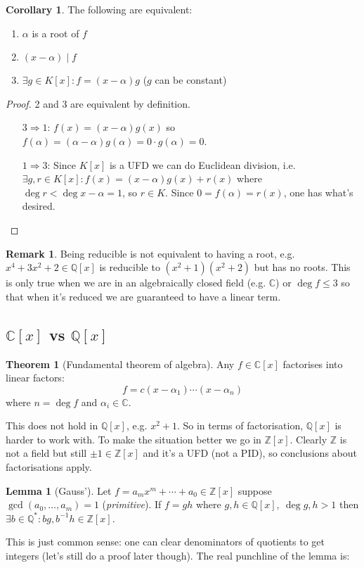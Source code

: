 \documentclass[a4paper]{article}
\newcommand{\Z}{\mathbb Z}
\newcommand{\Q}{\mathbb Q}
\newcommand{\C}{\mathbb C}
\theoremstyle{definition}
\newtheorem{thm}[defn]{Theorem}
\newtheorem{lemma}[defn]{Lemma}
\newtheorem{coro}[defn]{Corollary}
\newtheorem*{remark}{Remark}
\begin{document}
\begin{coro}
The following are equivalent:
\begin{enumerate}
\item $\alpha$ is a root of $f$
\item $(x-\alpha) \mid f$
\item $\exists g\in K[x]:f=(x-\alpha)g$ ($g$ can be constant)
\end{enumerate}
\end{coro}

\begin{proof}
2 and 3 are equivalent by definition.
\begin{itemize}
\item[$3\Rightarrow 1$:] $f(x)=(x-\alpha)g(x)$ so $f(\alpha)=(\alpha-\alpha)g(\alpha)=0\cdot g(\alpha)=0$.
\item[$1\Rightarrow 3$:] Since $K[x]$ is a UFD we can do Euclidean division, i.e. $\exists g,r\in K[x]:f(x)=(x-\alpha)g(x)+r(x)$ where $\deg r<\deg x-\alpha=1$, so $r\in K$. Since $0=f(\alpha)=r(x)$, one has what's desired.
\end{itemize}
\end{proof}

\begin{remark}
Being reducible is not equivalent to having a root, e.g. $x^4+3x^2+2\in\Q[x]$ is reducible to $(x^2+1)(x^2+2)$ but has no roots. This is only true when we are in an algebraically closed field (e.g. $\C$) or $\deg f\leq 3$ so that when it's reduced we are guaranteed to have a linear term.
\end{remark}
\subsection{$\C[x]$ vs $\Q[x]$}
\begin{thm}[Fundamental theorem of algebra]
Any $f\in\C[x]$ factorises into linear factors:
\[
f=c(x-\alpha_1)\cdots (x-\alpha_n)
\]
where $n=\deg f$ and $\alpha_i\in \C$.
\end{thm}
This does not hold in $\Q[x]$, e.g. $x^2+1$. So in terms of factorisation, $\Q[x]$ is harder to work with. To make the situation better we go in $\Z[x]$. Clearly $\Z$ is not a field but still $\pm 1\in\Z[x]$ and it's a UFD (not a PID), so conclusions about factorisations apply.

\begin{lemma}[Gauss']
Let $f=a_m x^m +\cdots+a_0\in\Z[x]$ suppose $\gcd (a_0,\ldots,a_m)=1$ (\textit{primitive}). If $f=gh$ where $g,h\in\Q[x],\ \deg g,h>1$ then $\exists b\in\Q^\ast:bg,b^{-1}h\in\Z[x]$.
\end{lemma}
This is just common sense: one can clear denominators of quotients to get integers (let's still do a proof later though). The real punchline of the lemma is:
\end{document}
